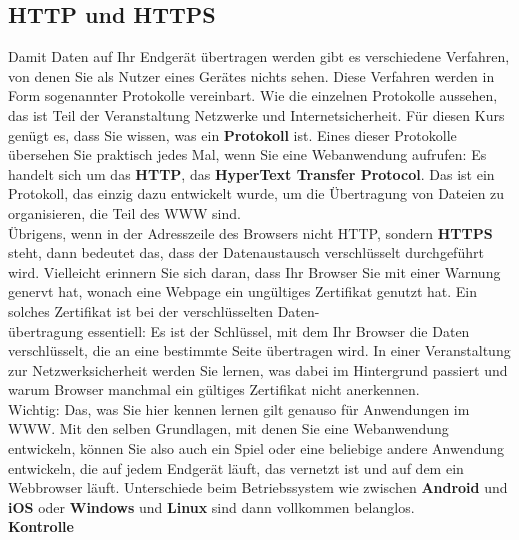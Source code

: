 \subsection{HTTP und HTTPS}

Damit Daten auf Ihr Endgerät übertragen werden gibt es verschiedene Verfahren, von denen Sie als Nutzer eines Gerätes nichts sehen. Diese Verfahren werden in Form sogenannter Protokolle vereinbart. Wie die einzelnen Protokolle aussehen, das ist Teil der Veranstaltung Netzwerke und Internetsicherheit. Für diesen Kurs genügt es, dass Sie wissen, was ein \textbf{Protokoll} ist. Eines dieser Protokolle übersehen Sie praktisch jedes Mal, wenn Sie eine Webanwendung aufrufen: Es handelt sich um das \textbf{HTTP}, das \textbf{HyperText Transfer Protocol}. Das ist ein Protokoll, das einzig dazu entwickelt wurde, um die Übertragung von Dateien zu organisieren, die Teil des WWW sind.\\

Übrigens, wenn in der Adresszeile des Browsers nicht HTTP, sondern \textbf{HTTPS} steht, dann bedeutet das, dass der Datenaustausch verschlüsselt durchgeführt wird. Vielleicht erinnern Sie sich daran, dass Ihr Browser Sie mit einer Warnung genervt hat, wonach eine Webpage ein ungültiges Zertifikat genutzt hat. Ein solches Zertifikat ist bei der verschlüsselten Daten-\\übertragung essentiell: Es ist der Schlüssel, mit dem Ihr Browser die Daten verschlüsselt, die an eine bestimmte Seite übertragen wird. In einer Veranstaltung zur Netzwerksicherheit werden Sie lernen, was dabei im Hintergrund passiert und warum Browser manchmal ein gültiges Zertifikat nicht anerkennen.\\

Wichtig: Das, was Sie hier kennen lernen gilt genauso für Anwendungen im WWW. Mit den selben Grundlagen, mit denen Sie eine Webanwendung entwickeln, können Sie also auch ein Spiel oder eine beliebige andere Anwendung entwickeln, die auf jedem Endgerät läuft, das vernetzt ist und auf dem ein Webbrowser läuft. Unterschiede beim Betriebssystem wie zwischen \textbf{Android} und \textbf{iOS} oder \textbf{Windows} und \textbf{Linux} sind dann vollkommen belanglos. \\

\textbf{Kontrolle}

